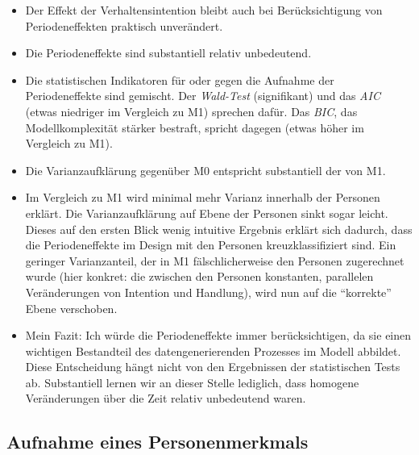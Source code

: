 \documentclass[
]{book}
\newenvironment{Shaded}{\begin{snugshade}}{\end{snugshade}}
\newcommand{\CommentTok}[1]{\textcolor[rgb]{0.56,0.35,0.01}{\textit{#1}}}
\newcommand{\DataTypeTok}[1]{\textcolor[rgb]{0.13,0.29,0.53}{#1}}
\newcommand{\DecValTok}[1]{\textcolor[rgb]{0.00,0.00,0.81}{#1}}
\newcommand{\KeywordTok}[1]{\textcolor[rgb]{0.13,0.29,0.53}{\textbf{#1}}}
\newcommand{\NormalTok}[1]{#1}
\newcommand{\OperatorTok}[1]{\textcolor[rgb]{0.81,0.36,0.00}{\textbf{#1}}}
\newcommand{\OtherTok}[1]{\textcolor[rgb]{0.56,0.35,0.01}{#1}}
\newcommand{\StringTok}[1]{\textcolor[rgb]{0.31,0.60,0.02}{#1}}
\providecommand{\tightlist}{%
  \setlength{\itemsep}{0pt}\setlength{\parskip}{0pt}}
\begin{document}
\begin{itemize}
\tightlist
\item
  Der Effekt der Verhaltensintention bleibt auch bei Berücksichtigung von Periodeneffekten praktisch unverändert.
\item
  Die Periodeneffekte sind substantiell relativ unbedeutend.
\item
  Die statistischen Indikatoren für oder gegen die Aufnahme der Periodeneffekte sind gemischt. Der \emph{Wald-Test} (signifikant) und das \emph{AIC} (etwas niedriger im Vergleich zu M1) sprechen dafür. Das \emph{BIC}, das Modellkomplexität stärker bestraft, spricht dagegen (etwas höher im Vergleich zu M1).
\item
  Die Varianzaufklärung gegenüber M0 entspricht substantiell der von M1.
\item
  Im Vergleich zu M1 wird minimal mehr Varianz innerhalb der Personen erklärt. Die Varianzaufklärung auf Ebene der Personen sinkt sogar leicht. Dieses auf den ersten Blick wenig intuitive Ergebnis erklärt sich dadurch, dass die Periodeneffekte im Design mit den Personen kreuzklassifiziert sind. Ein geringer Varianzanteil, der in M1 fälschlicherweise den Personen zugerechnet wurde (hier konkret: die zwischen den Personen konstanten, parallelen Veränderungen von Intention und Handlung), wird nun auf die ``korrekte'' Ebene verschoben.
\item
  Mein Fazit: Ich würde die Periodeneffekte immer berücksichtigen, da sie einen wichtigen Bestandteil des datengenerierenden Prozesses im Modell abbildet. Diese Entscheidung hängt nicht von den Ergebnissen der statistischen Tests ab. Substantiell lernen wir an dieser Stelle lediglich, dass homogene Veränderungen über die Zeit relativ unbedeutend waren.
\end{itemize}

\hypertarget{aufnahme-eines-personenmerkmals}{%
\subsection*{Aufnahme eines Personenmerkmals}\label{aufnahme-eines-personenmerkmals}}

\begin{Shaded}
\end{Shaded}
\end{document}
